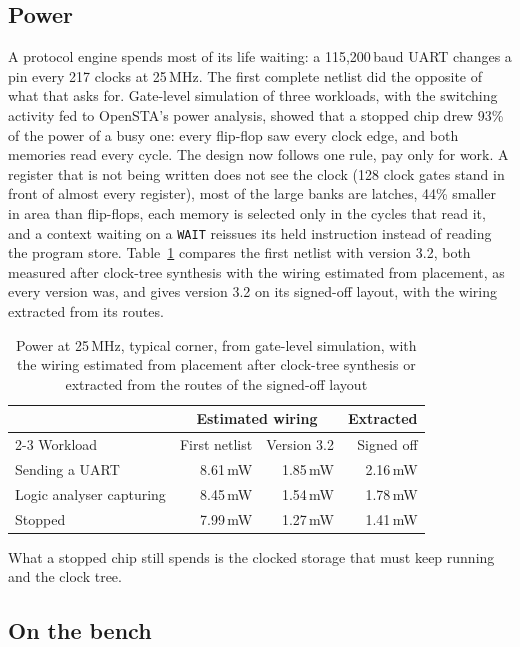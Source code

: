 \documentclass[conference,letterpaper]{IEEEtran}
\begin{document}
\subsection{Power}

A protocol engine spends most of its life waiting: a 115{,}200\,baud UART changes a pin
every 217 clocks at 25\,MHz. The first complete netlist did the opposite of what that
asks for. Gate-level simulation of three workloads, with the switching activity fed to
OpenSTA's power analysis, showed that a stopped chip drew 93\% of the power of a busy
one: every flip-flop saw every clock edge, and both memories read every cycle. The design
now follows one rule, pay only for work. A register that is not being written does not
see the clock (128 clock gates stand in front of almost every register), most of the large
banks are latches, 44\% smaller in area than flip-flops, each memory is selected only in the cycles
that read it, and a context waiting on a \texttt{WAIT} reissues its held instruction instead
of reading the program store. Table~\ref{tab:power} compares the first netlist with
version 3.2, both measured after clock-tree synthesis with the wiring estimated from
placement, as every version was, and gives version 3.2 on its signed-off layout, with the
wiring extracted from its routes.

\begin{table}[t]
\centering
\caption{Power at 25\,MHz, typical corner, from gate-level simulation, with the wiring estimated from placement after clock-tree synthesis or extracted from the routes of the signed-off layout}
\label{tab:power}
\footnotesize
\begin{tabular}{@{}lrrr@{}}
\toprule
 & \multicolumn{2}{c}{Estimated wiring} & Extracted \\
\cmidrule(lr){2-3}
Workload & First netlist & Version 3.2 & Signed off \\
\midrule
Sending a UART & 8.61\,mW & 1.85\,mW & 2.16\,mW \\
Logic analyser capturing & 8.45\,mW & 1.54\,mW & 1.78\,mW \\
Stopped & 7.99\,mW & 1.27\,mW & 1.41\,mW \\
\bottomrule
\end{tabular}
\end{table}

What a stopped chip still spends is the clocked storage that must keep running and the
clock tree.

\subsection{On the bench}
\end{document}
